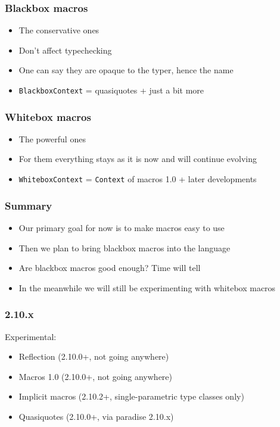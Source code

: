 \documentclass[svgnames,hyperref={bookmarks=false}]{beamer}
\begin{document}
\begin{frame}[fragile]
\frametitle{Blackbox macros}

\begin{itemize}
\item The conservative ones
\item Don't affect typechecking
\item One can say they are opaque to the typer, hence the name
\item \texttt{BlackboxContext} = quasiquotes + just a bit more
\end{itemize}
\end{frame}

\begin{frame}[fragile]
\frametitle{Whitebox macros}

\begin{itemize}
\item The powerful ones
\item For them everything stays as it is now and will continue evolving
\item \texttt{WhiteboxContext} = \texttt{Context} of macros 1.0 + later developments
\end{itemize}
\end{frame}

\begin{frame}[fragile]
\frametitle{Summary}

\begin{itemize}
\item Our primary goal for now is to make macros easy to use
\item Then we plan to bring blackbox macros into the language
\item Are blackbox macros good enough? Time will tell
\item In the meanwhile we will still be experimenting with whitebox macros
\end{itemize}
\end{frame}

\begin{frame}[fragile]
\frametitle{}

\vskip40pt
\begin{center}
\end{center}
\end{frame}

\begin{frame}[fragile]
\frametitle{2.10.x}

Experimental:
\begin{itemize}
\item Reflection (2.10.0+, not going anywhere)
\item Macros 1.0 (2.10.0+, not going anywhere)
\item Implicit macros (2.10.2+, single-parametric type classes only)
\item Quasiquotes (2.10.0+,  via paradise 2.10.x)
\end{itemize}
\end{frame}
\end{document}
